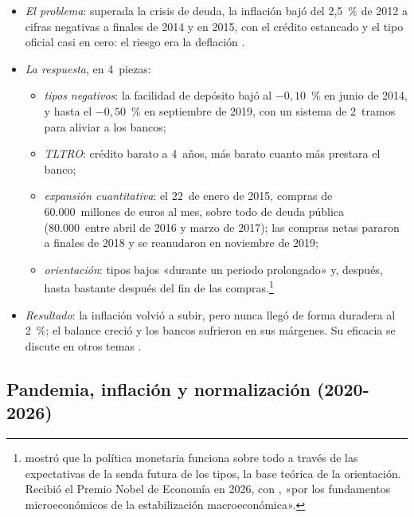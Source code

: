 \documentclass[11pt]{article}
\begin{document}
\begin{itemize}
\item \emph{El problema}: superada la crisis de deuda, la inflación bajó del 2,5~\% de 2012 a cifras negativas a finales de 2014 y en 2015, con el crédito estancado y el tipo oficial casi en cero: el riesgo era la deflación .
\item \emph{La respuesta}, en 4~piezas:
  \begin{itemize}
  \item \emph{tipos negativos}: la facilidad de depósito bajó al $-0{,}10$~\% en junio de 2014, y hasta el $-0{,}50$~\% en septiembre de 2019, con un sistema de 2~tramos para aliviar a los bancos;
  \item \emph{TLTRO}: crédito barato a 4~años, más barato cuanto más prestara el banco;
  \item \emph{expansión cuantitativa}: el 22~de enero de 2015, compras de 60.000~millones de euros al mes, sobre todo de deuda pública (80.000~entre abril de 2016 y marzo de 2017); las compras netas pararon a finales de 2018 y se reanudaron en noviembre de 2019;
  \item \emph{orientación}: tipos bajos «durante un periodo prolongado» y, después, hasta bastante después del fin de las compras.\footnote{ mostró que la política monetaria funciona sobre todo a través de las expectativas de la senda futura de los tipos, la base teórica de la orientación\nocite{Woodford2003Interest}. Recibió el Premio Nobel de Economía en 2026, con , «por los fundamentos microeconómicos de la estabilización macroeconómica»\nocite{Nobel2026Prensa}.}
  \end{itemize}
\item \emph{Resultado}: la inflación volvió a subir, pero nunca llegó de forma duradera al 2~\%; el balance creció y los bancos sufrieron en sus márgenes. Su eficacia se discute en otros temas  .
\end{itemize}

\subsection{Pandemia, inflación y normalización (2020-2026)}\label{sec:pandemia}
\end{document}
